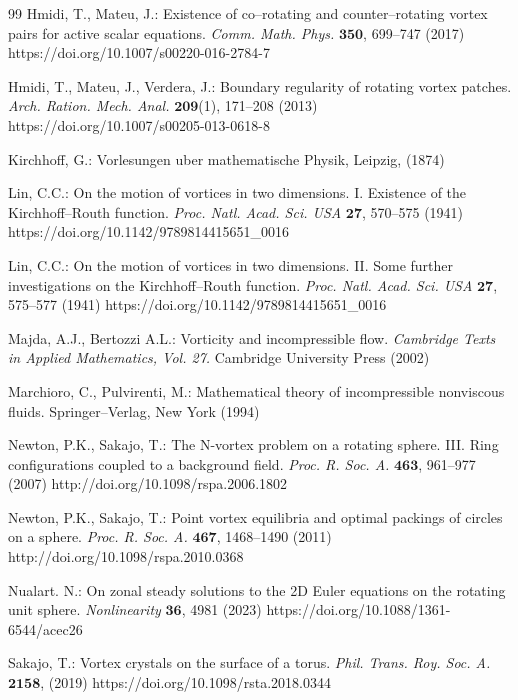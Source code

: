 \documentclass[12pt,reqno]{amsart}
\numberwithin{equation}{section}
\theoremstyle{definition}
\theoremstyle{remark}
\begin{document}
\begin{thebibliography}{99}
	Hmidi, T., Mateu, J.: Existence of co--rotating and counter--rotating vortex pairs for active scalar equations.
	\textit{Comm. Math. Phys.} $\boldsymbol{350}$, 699--747 (2017) https://doi.org/10.1007/s00220-016-2784-7
	
	Hmidi, T., Mateu, J., Verdera, J.: Boundary regularity of rotating vortex patches. \textit{Arch. Ration. Mech. Anal.} $\boldsymbol{209}$(1), 171--208 (2013) https://doi.org/10.1007/s00205-013-0618-8
	
	Kirchhoff, G.: Vorlesungen uber mathematische Physik, Leipzig, (1874)
	
	Lin, C.C.: On the motion of vortices in two dimensions. I. Existence of the Kirchhoff--Routh function. \textit{Proc. Natl. Acad. Sci. USA} $\boldsymbol{27}$, 570--575 (1941) https://doi.org/10.1142/9789814415651\_0016
	
	Lin, C.C.: On the motion of vortices in two dimensions. II. Some further investigations on the Kirchhoff--Routh function. \textit{Proc. Natl. Acad. Sci. USA} $\boldsymbol{27}$, 575--577 (1941) https://doi.org/10.1142/9789814415651\_0016
	
	Majda, A.J., Bertozzi A.L.: Vorticity and incompressible flow.
	\textit{Cambridge Texts in Applied Mathematics, Vol. 27.} Cambridge University Press (2002)
	
	
	Marchioro, C., Pulvirenti, M.: Mathematical theory of incompressible nonviscous fluids. Springer--Verlag, New York (1994)
	
	Newton, P.K., Sakajo, T.: The N-vortex problem on a rotating sphere. III. Ring configurations coupled to a background field. \textit{Proc. R. Soc. A.} $\boldsymbol{463}$, 961--977 (2007) http://doi.org/10.1098/rspa.2006.1802
	
	Newton, P.K., Sakajo, T.: Point vortex equilibria and optimal packings of circles on a sphere. \textit{Proc. R. Soc. A.} $\boldsymbol{467}$, 1468--1490 (2011) http://doi.org/10.1098/rspa.2010.0368
	
	Nualart. N.: On zonal steady solutions to the 2D Euler equations on the rotating unit sphere. \textit{Nonlinearity}  $\boldsymbol{36}$, 4981 (2023) https://doi.org/10.1088/1361-6544/acec26
	
	Sakajo, T.: Vortex crystals on the surface of a torus. \textit{Phil. Trans. Roy. Soc. A.} $\boldsymbol{2158}$, (2019)  https://doi.org/10.1098/rsta.2018.0344
	

\end{thebibliography}
\end{document}
